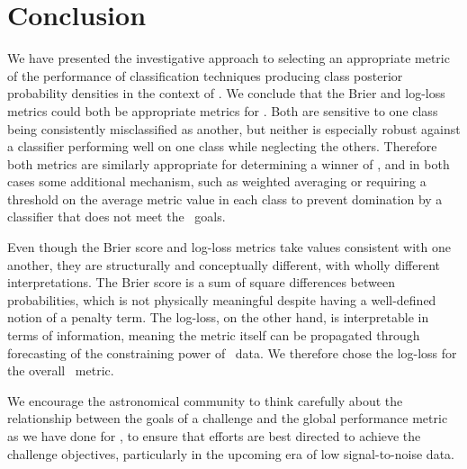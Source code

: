 \section{Conclusion}
\label{sec:conclusion}

We have presented the investigative approach to selecting an appropriate metric of the performance of classification techniques producing class posterior probability densities in the context of \plasticc.
We conclude that the Brier and log-loss metrics could both be appropriate metrics for \plasticc.
Both are sensitive to one class being consistently misclassified as another, but neither is especially robust against a classifier performing well on one class while neglecting the others.
Therefore both metrics are similarly appropriate for determining a winner of \plasticc, and in both cases some additional mechanism, such as weighted averaging or requiring a threshold on the average metric value in each class to prevent domination by a classifier that does not meet the \plasticc\ goals.

Even though the Brier score and log-loss metrics take values consistent with one another, they are structurally and conceptually different, with wholly different interpretations.
The Brier score is a sum of square differences between probabilities, which is not physically meaningful despite having a well-defined notion of a penalty term.
The log-loss, on the other hand, is interpretable in terms of information, meaning the metric itself can be propagated through forecasting of the constraining power of \lsst\ data.
We therefore chose the log-loss for the overall \plasticc\ metric.

We encourage the astronomical community to think carefully about the relationship between the goals of a challenge and the global performance metric as we have done for \plasticc, to ensure that efforts are best directed to achieve the challenge objectives, particularly in the upcoming era of low signal-to-noise data.
